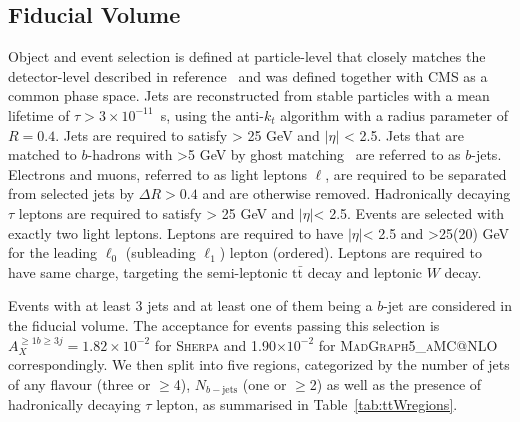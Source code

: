 
\subsection{Fiducial Volume}
\label{sec:ttw_fid}
Object and event selection is defined at particle-level that closely matches the detector-level described in reference~\cite{ATLAS-CONF-2019-045} and was defined together with CMS as a common phase space. 
Jets are reconstructed from stable particles with a mean lifetime of $\tau > 3\times 10^{-11}$~s, using the anti-$k_t$ algorithm with a radius parameter of $R=0.4$.
Jets are required to satisfy \pt > 25 GeV and $|\eta|$ < 2.5.
Jets that are matched to $b$-hadrons with \pt>5 GeV by ghost matching~\cite{Cacciari:2008gn} are referred to as $b$-jets. 
Electrons and muons, referred to as light leptons $\ell$, are required to be separated from selected jets by $\Delta R>0.4$ and are otherwise removed. 
Hadronically decaying $\tau$ leptons are required to satisfy \pt> 25 GeV and $|\eta| $< 2.5.
Events are selected with exactly two light leptons.
Leptons are required to have $|\eta|$< 2.5 and \pt>25(20) GeV for the leading $\ell_0$ (subleading $\ell_1$) lepton (\pt ordered). 
Leptons are required to have same charge, targeting the semi-leptonic $\mathrm{t\bar{t}}$ decay and leptonic $W$ decay.

Events with at least 3 jets and at least one of them being a $b$-jet are considered in the fiducial volume. 
The acceptance for events passing this selection is $A_X^{\geq1b\geq3j}=1.82\times10^{-2}$ for \textsc{Sherpa} and 1.90$\times10^{-2}$ for \textsc{MadGraph5\_aMC@NLO} correspondingly.
We then split into five regions, categorized by the number of jets of any flavour (three or  $\geq$4), $N_{b-\mathrm{jets}}$ (one or $\geq$2) as well as the presence of hadronically decaying $\tau$ lepton, as summarised in Table~\ref{tab:ttWregions}.


